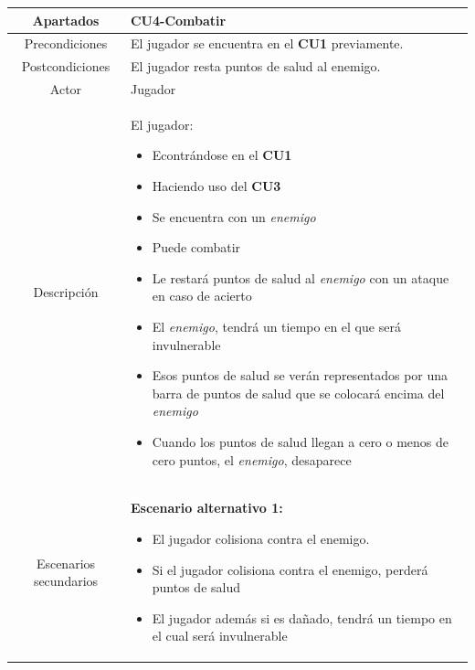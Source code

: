 \documentclass[a4paper]{article}
\begin{document}
\begin{table}[!ht]
    \centering
    \begin{tabular}{|c|p{12cm}|}
        \hline
        \textbf{Apartados}     & \textbf{CU4-Combatir}                                                                                \\
        \hline
        Precondiciones         & El jugador se encuentra en el \textbf{CU1} previamente.                                              \\
        \hline
        Postcondiciones        & El jugador resta puntos de salud al enemigo.                                                         \\
        \hline
        Actor                  & Jugador                                                                                              \\
        \hline
        Descripción            & El jugador:
        \begin{itemize}
            \item Econtrándose en el \textbf{CU1}
            \item Haciendo uso del \textbf{CU3}
            \item Se encuentra con un \textit{enemigo}
            \item[\faAngleRight] Puede combatir
            \item Le restará puntos de salud al \textit{enemigo} con un ataque en caso de acierto
            \item El \textit{enemigo}, tendrá un tiempo en el que será invulnerable
            \item Esos puntos de salud se verán representados por una barra de puntos de salud que se colocará encima del \textit{enemigo}
            \item[\faAngleRight] Cuando los puntos de salud llegan a cero o menos de cero puntos, el \textit{enemigo}, desaparece
        \end{itemize} \\
        \hline
        Escenarios secundarios & \textbf{Escenario alternativo 1:}
        \begin{itemize}
            \item El jugador colisiona contra el enemigo.
            \item[\faAngleRight] Si el jugador colisiona contra el enemigo, perderá puntos de salud
            \item El jugador además si es dañado, tendrá un tiempo en el cual será invulnerable

\end{itemize}
\end{tabular}
\end{table}
\end{document}
